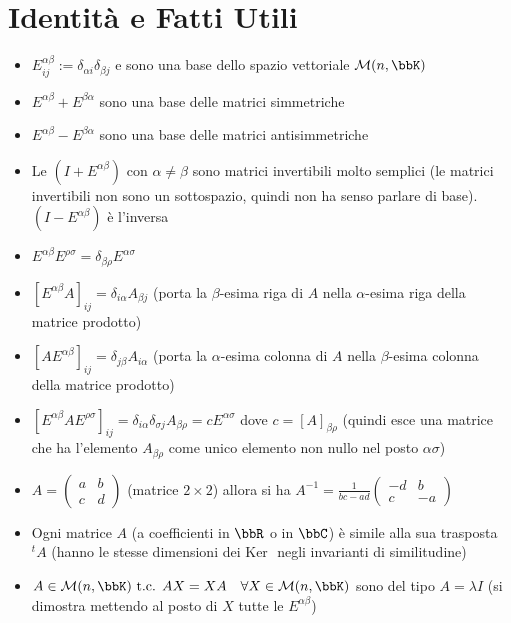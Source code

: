 \documentclass[a4paper,NoNotes]{stdmdoc}
\newcommand{\tc}{\mbox{ t.c. }}
\newcommand{\Ker}{\mbox{Ker } }
\begin{document}
	\newpage
	\section*{Identità e Fatti Utili}
	\begin{itemize}
		\item $E_{ij}^{\alpha\beta} := \delta_{\alpha i} \delta_{\beta j}$ e sono una base dello spazio vettoriale $\mathcal{M}(n,\bbK)$
		\item $E^{\alpha\beta} + E^{\beta\alpha}$ sono una base delle matrici simmetriche
		\item $E^{\alpha\beta} - E^{\beta\alpha}$ sono una base delle matrici antisimmetriche
		\item Le $(I + E^{\alpha\beta})$ con $\alpha \neq \beta$ sono matrici invertibili molto semplici (le matrici invertibili non sono un sottospazio, quindi non ha senso parlare di base). $(I - E^{\alpha\beta})$ è l'inversa
		\item $E^{\alpha\beta}E^{\rho\sigma} = \delta_{\beta\rho} E^{\alpha\sigma}$
		\item $[E^{\alpha\beta}A]_{ij} = \delta_{i\alpha}A_{\beta j}$ (porta la $\beta$-esima riga di $A$ nella $\alpha$-esima riga della matrice prodotto)
		\item $[AE^{\alpha\beta}]_{ij} = \delta_{j\beta}A_{i\alpha}$ (porta la $\alpha$-esima colonna di $A$ nella $\beta$-esima colonna della matrice prodotto)
		\item $[E^{\alpha\beta}AE^{\rho\sigma}]_{ij} = \delta_{i\alpha}\delta_{\sigma j}A_{\beta\rho} = cE^{\alpha\sigma}$ dove $c = [A]_{\beta\rho}$ (quindi esce una matrice che ha l'elemento $A_{\beta\rho}$ come unico elemento non nullo nel posto $\alpha\sigma$)
		\item $A = \left( \begin{array}{cc} a & b \\ c & d \end{array} \right)$ (matrice $2\times 2$) allora si ha $A^{-1} = \frac{1}{bc-ad} \left( \begin{array}{cc} -d & b \\ c & -a \end{array} \right)$
		\item Ogni matrice $A$ (a coefficienti in $\bbR$ o in $\bbC$) è simile alla sua trasposta ${}^tA$ (hanno le stesse dimensioni dei $\Ker$ negli invarianti di similitudine)
		\item $A \in \mathcal{M}(n, \bbK) \tc AX = XA \quad \forall X \in \mathcal{M}(n, \bbK)$ sono del tipo $A = \lambda I$ (si dimostra mettendo al posto di $X$ tutte le $E^{\alpha\beta}$)

\end{itemize}
\end{document}
